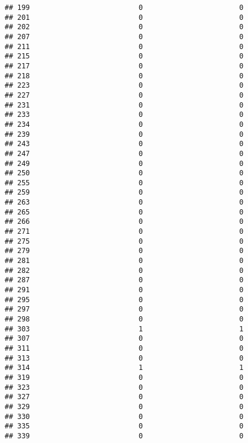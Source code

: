 \documentclass[
]{article}
\begin{document}
\begin{verbatim}
## 199                          0                       0
## 201                          0                       0
## 202                          0                       0
## 207                          0                       0
## 211                          0                       0
## 215                          0                       0
## 217                          0                       0
## 218                          0                       0
## 223                          0                       0
## 227                          0                       0
## 231                          0                       0
## 233                          0                       0
## 234                          0                       0
## 239                          0                       0
## 243                          0                       0
## 247                          0                       0
## 249                          0                       0
## 250                          0                       0
## 255                          0                       0
## 259                          0                       0
## 263                          0                       0
## 265                          0                       0
## 266                          0                       0
## 271                          0                       0
## 275                          0                       0
## 279                          0                       0
## 281                          0                       0
## 282                          0                       0
## 287                          0                       0
## 291                          0                       0
## 295                          0                       0
## 297                          0                       0
## 298                          0                       0
## 303                          1                       1
## 307                          0                       0
## 311                          0                       0
## 313                          0                       0
## 314                          1                       1
## 319                          0                       0
## 323                          0                       0
## 327                          0                       0
## 329                          0                       0
## 330                          0                       0
## 335                          0                       0
## 339                          0                       0

\end{verbatim}
\end{document}
